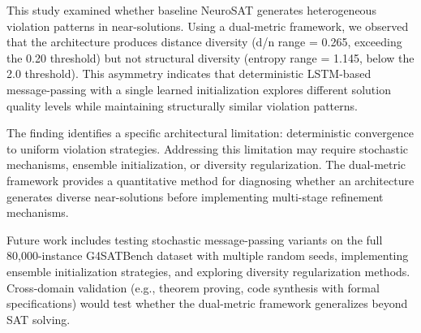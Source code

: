 
This study examined whether baseline NeuroSAT generates heterogeneous violation patterns in near-solutions. Using a dual-metric framework, we observed that the architecture produces distance diversity (d/n range = 0.265, exceeding the 0.20 threshold) but not structural diversity (entropy range = 1.145, below the 2.0 threshold). This asymmetry indicates that deterministic LSTM-based message-passing with a single learned initialization explores different solution quality levels while maintaining structurally similar violation patterns.

The finding identifies a specific architectural limitation: deterministic convergence to uniform violation strategies. Addressing this limitation may require stochastic mechanisms, ensemble initialization, or diversity regularization. The dual-metric framework provides a quantitative method for diagnosing whether an architecture generates diverse near-solutions before implementing multi-stage refinement mechanisms.

Future work includes testing stochastic message-passing variants on the full 80,000-instance G4SATBench dataset with multiple random seeds, implementing ensemble initialization strategies, and exploring diversity regularization methods. Cross-domain validation (e.g., theorem proving, code synthesis with formal specifications) would test whether the dual-metric framework generalizes beyond SAT solving.
